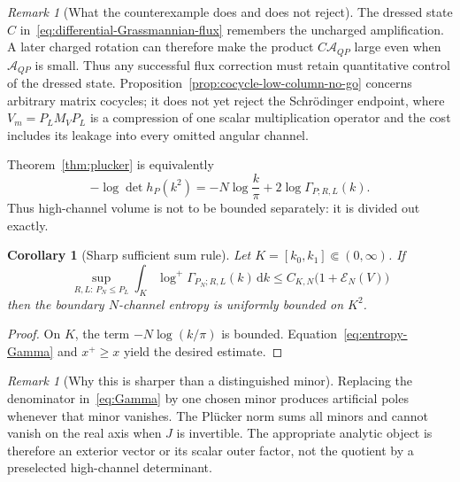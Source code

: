 \documentclass[11pt]{article}
\newcommand{\cE}{\mathcal E}
\newcommand{\dd}{\,\mathrm d}
\newtheorem{corollary}[theorem]{Corollary}
\theoremstyle{definition}
\theoremstyle{remark}
\newtheorem{remark}[theorem]{Remark}
\begin{document}
\begin{remark}[What the counterexample does and does not reject]
The dressed state $C$ in~\eqref{eq:differential-Grassmannian-flux} remembers
the uncharged amplification.  A later charged rotation can therefore make the
product $C\mathcal A_{QP}$ large even when $\mathcal A_{QP}$ is small.  Thus
any successful flux correction must retain quantitative control of the dressed
state.  Proposition~\ref{prop:cocycle-low-column-no-go} concerns arbitrary
matrix cocycles; it does not yet reject the Schr\"odinger endpoint, where
$V_m=P_LM_VP_L$ is a compression of one scalar multiplication operator and the
cost includes its leakage into every omitted angular channel.
\end{remark}

Theorem~\ref{thm:plucker} is equivalently
\begin{equation}
 -\log\det h_P(k^2)
 =-N\log\frac{k}{\pi}+2\log\Gamma_{P;R,L}(k).
 \label{eq:entropy-Gamma}
\end{equation}
Thus high-channel volume is not to be bounded separately: it is divided out exactly.

\begin{corollary}[Sharp sufficient sum rule]\label{cor:PSR}
Let $K=[k_0,k_1]\Subset(0,\infty)$.  If
\begin{equation}
 \sup_{R,L:\,P_N\leq P_L}
 \int_K\log^+\Gamma_{P_N;R,L}(k)\dd k
 \leq C_{K,N}\bigl(1+\cE_N(V)\bigr)
 \label{eq:PSR}
\end{equation}
then the boundary $N$-channel entropy is uniformly bounded on $K^2$.
\end{corollary}

\begin{proof}
On $K$, the term $-N\log(k/\pi)$ is bounded.  Equation~\eqref{eq:entropy-Gamma} and $x^+\geq x$ yield the desired estimate.
\end{proof}

\begin{remark}[Why this is sharper than a distinguished minor]
Replacing the denominator in~\eqref{eq:Gamma} by one chosen minor produces artificial poles whenever that minor vanishes.  The Pl\"ucker norm sums all minors and cannot vanish on the real axis when $J$ is invertible.  The appropriate analytic object is therefore an exterior vector or its scalar outer factor, not the quotient by a preselected high-channel determinant.
\end{remark}
\end{document}
